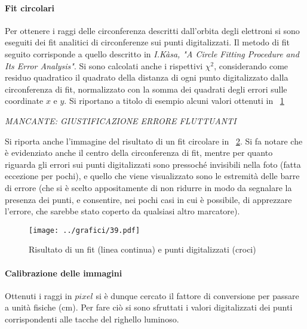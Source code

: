\documentclass[10pt,a4paper]{article}
\begin{document}
\paragraph{Fit circolari} Per ottenere i raggi delle circonferenza descritti dall'orbita degli elettroni si sono eseguiti dei fit analitici di circonferenze sui punti digitalizzati. Il metodo di fit seguito corrisponde a quello descritto in \emph{I.Kàsa, "A Circle Fitting Procedure and Its Error Analysis"}.
Si sono calcolati anche i rispettivi $\chi^2$, considerando come residuo quadratico il quadrato della distanza di ogni punto digitalizzato dalla circonferenza di fit, normalizzato con la somma dei quadrati degli errori sulle coordinate $x$ e $y$.
Si riportano a titolo di esempio alcuni valori ottenuti in \tablename{~\ref{tab:rpchi2}}

\begin{figure}[H]
	\centering
	\resizebox{0.3\textwidth}{!}{
		}
	\label{tab:rpchi2}
\end{figure}

\emph{MANCANTE: GIUSTIFICAZIONE ERRORE FLUTTUANTI}

Si riporta anche l'immagine del risultato di un fit circolare in \figurename{~\ref{fig:fitcfr}}. Si fa notare che è evidenziato anche il centro della circonferenza di fit, mentre per quanto riguarda gli errori sui punti digitalizzati sono pressoché invisibili nella foto (fatta eccezione per pochi), e quello che viene visualizzato sono le estremità delle barre di errore (che si è scelto appositamente di non ridurre in modo da segnalare la presenza dei punti, e consentire, nei pochi casi in cui è possibile, di apprezzare l'errore, che sarebbe stato coperto da qualsiasi altro marcatore).

\begin{figure}[H]
	\centering
	\texttt{[image: ../grafici/39.pdf]}
	\caption{Risultato di un fit (linea continua) e punti digitalizzati (croci)}
	\label{fig:fitcfr}
\end{figure}

\paragraph{Calibrazione delle immagini} Ottenuti i raggi in $pixel$ si è dunque cercato il fattore di conversione per passare a unità fisiche (cm). Per fare ciò si sono sfruttati i valori digitalizzati dei punti corrispondenti alle tacche del righello luminoso.
\end{document}
